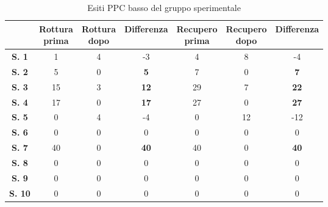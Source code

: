 \begin{table}[H]
\begin{center}
\begin{tabular}{|c|c|c|c|c|c|c|} \hline
{\textbf{}} & \pbox{20cm}{\textbf{Rottura} \\ \textbf{prima}} & \pbox{20cm}{\textbf{Rottura} \\ \textbf{dopo}} & \textbf{Differenza} & \pbox{20cm}{\textbf{Recupero} \\ \textbf{prima}} & \pbox{20cm}{\textbf{Recupero} \\ \textbf{dopo}} & \textbf{Differenza} \\ \hline
\textbf{S. 1} & 1 & 4 & -3 & 4 & 8 & -4 \\ \hline
\textbf{S. 2} & 5 & 0 & \textbf{5} & 7 & 0 & \textbf{7} \\ \hline
\textbf{S. 3} & 15 & 3 & \textbf{12} & 29 & 7 & \textbf{22}  \\ \hline
\textbf{S. 4} & 17 & 0 & \textbf{17} & 27 & 0 & \textbf{27}  \\ \hline
\textbf{S. 5} & 0 & 4 & -4 & 0 & 12 & -12  \\ \hline
\textbf{S. 6} & 0 & 0 & 0 & 0 & 0 & 0 \\ \hline
\textbf{S. 7} & 40 & 0 & \textbf{40} & 40 & 0 & \textbf{40} \\ \hline
\textbf{S. 8} & 0 & 0 & 0 & 0 & 0 & 0 \\ \hline
\textbf{S. 9} & 0 & 0 & 0 & 0 & 0 & 0 \\ \hline
\textbf{S. 10} & 0 & 0 & 0 & 0 & 0 & 0 \\ \hline

\end{tabular}
\end{center}
\caption{Esiti PPC basso del gruppo sperimentale}
\end{table}
\\\ \\\ \\\ \\\ \\\ \\\ \\\ \\\ \\\ \\\ \\\ 

